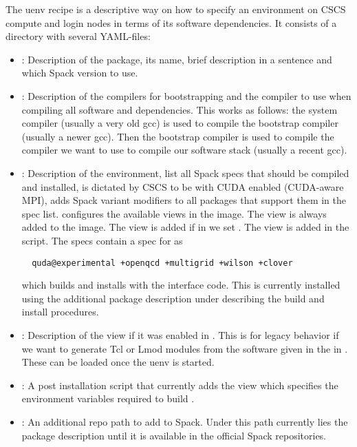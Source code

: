 The uenv recipe is a descriptive way on how to specify an environment on CSCS compute and login nodes in terms of its software dependencies.
It consists of a directory with several YAML-files:
\begin{itemize}
  \item {}: Description of the package, its name, brief description in a sentence and which Spack version to use.
  \item {}: Description of the compilers for bootstrapping and the compiler to use when compiling all software and dependencies. This works as follows: the system compiler (usually a very old gcc) is used to compile the bootstrap compiler (usually a newer gcc). Then the bootstrap compiler is used to compile the compiler we want to use to compile our software stack (usually a recent gcc).
  \item{: Description of the environment, \ie {} list all Spack specs that should be compiled and installed,  is dictated by CSCS to be  with CUDA enabled (CUDA-aware MPI),  adds Spack variant modifiers to all packages that support them in the spec list.  configures the available views in the image. The view  is always added to the image. The view  is added if in  we set . The  view is added in the  script. The specs contain a spec for \quda as
  \begin{verbatim}
  quda@experimental +openqcd +multigrid +wilson +clover
  \end{verbatim}
  which builds and installs \quda with the interface code. This is currently installed using the additional package description under  describing the \quda build and install procedures.}
  \item {}: Description of the  view if it was enabled in . This is for legacy behavior if we want to generate Tcl\cite{online:tcl} or Lmod\cite{github:lmod} modules from the software given in the  in . These can be loaded once the uenv is started.
  \item {}: A post installation script that currently adds the  view which specifies the environment variables required to build \openqxd.
  \item {}: An additional repo path to add to Spack. Under this path currently lies the \quda package description until it is available in the official Spack repositories.
\end{itemize}

